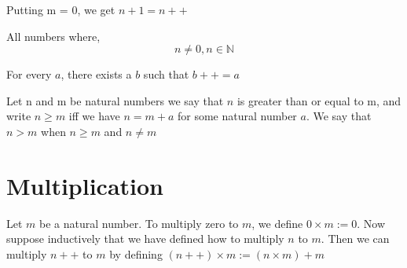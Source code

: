 \documentclass[11pt]{report}
\begin{document}
Putting m = 0, we get \(n+1 = n++\)
\begin{definition}
All numbers where,
\[
n \neq 0, n \in \mathbb{N}
\]
\end{definition}

\begin{lemma}
For every $a$, there exists a $b$ such that $b++ = a$
\end{lemma}

\begin{definition}[Order]
Let n and m be natural numbers we say that $n$ is greater than or equal to m, and write $n \geq m$ iff we have $n = m + a$ for some natural number $a$. We say that $n > m$ when $n \geq m$ and $n \neq m$
\end{definition}
\section{Multiplication}
\label{sec:orgf28d9ee}
\begin{definition}
Let \(m\) be a natural number. To multiply zero to \(m\), we define \(0 \times m := 0\). Now suppose inductively that we have defined how to multiply \(n\) to \(m\). Then we can multiply \(n++\) to \(m\) by defining \((n++) \times m := (n \times m) + m\)
\end{definition}
\end{document}
